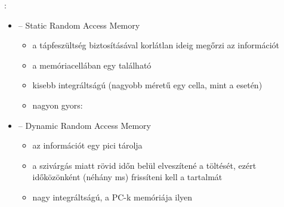 \documentclass[main.tex]{subfiles}
\begin{document}
  {\large {}:}
  \begin{itemize}
    \item {} \tabto{1.8cm} – \tabto{2.5cm}
    Static Random Access Memory
    \begin{itemize}
      \item  a tápfeszültség biztosításával korlátlan
      ideig megőrzi az információt

      \item a memóriacellában egy  található
      
      \item kisebb integráltságú
      (nagyobb méretű egy cella, mint a  esetén)

      \item nagyon gyors: 
    \end{itemize}

    \item {} \tabto{1.8cm} – \tabto{2.5cm}
    Dynamic Random Access Memory
    \begin{itemize}
      \item az információt egy pici
       tárolja

      \item a szivárgás miatt rövid időn belül elveszítené a töltését,
      ezért időközönként (néhány ms) frissíteni kell a tartalmát

      \item nagy integráltságú, a PC-k memóriája ilyen
    \end{itemize}
  \end{itemize}
\end{document}
